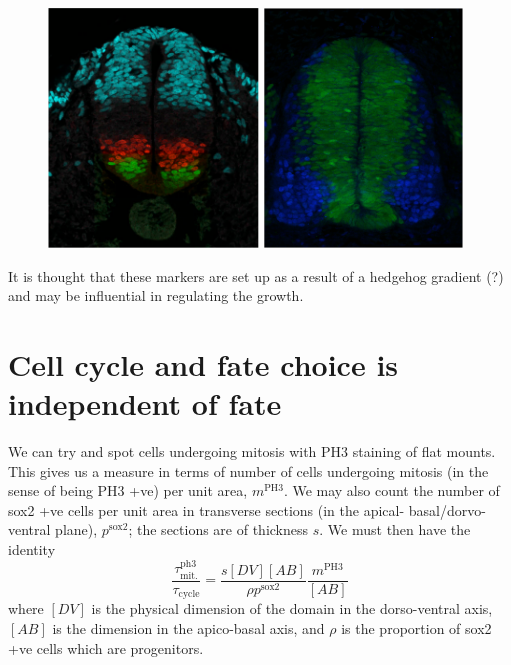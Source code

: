 \documentclass[10pt,english]{article}
\begin{document}
\begin{figure}[h]
	\begin{center}
		\includegraphics[height=2.5in]{transverse-stained-domains.pdf}
		\includegraphics[height=2.5in]{transverse-stained-sox2-p27.pdf}
	\end{center}
\end{figure}

It is thought that these markers are set up as a result of a hedgehog gradient (?)
and may be influential in regulating the growth.

\section{Cell cycle and fate choice is independent of fate}

We can try and spot cells undergoing mitosis with PH3 staining of flat mounts.
This gives us a measure in terms of number of cells undergoing mitosis (in the
sense of being PH3 +ve) per unit area, $m^\textrm{PH3}$. We may also count the
number of sox2 +ve cells per unit area in transverse sections (in the apical-
basal/dorvo-ventral plane), $p^\textrm{sox2}$; the sections are of thickness $s$. 
We must then have the identity
$$ \frac{\tau^\textrm{ph3}_\textrm{mit.}}{\tau_\textrm{cycle}} = 
	\frac{s[DV][AB]}{\rho p^\textrm{sox2}} \frac{m^\textrm{PH3}}{[AB]} $$
where $[DV]$ is the physical dimension of the domain in the dorso-ventral axis,
$[AB]$ is the dimension in the apico-basal axis, and $\rho$ is the proportion of 
sox2 +ve cells which are progenitors.
\end{document}

